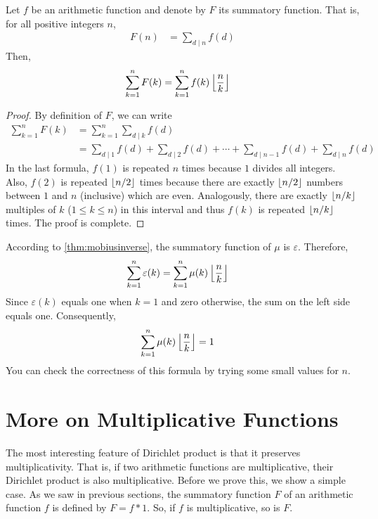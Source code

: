 	\begin{theorem}\label{thm:sum-of-sum-function}
		Let $f$ be an arithmetic function and denote by $F$ its summatory function. That is, for all positive integers $n$,
			\begin{align*}
				F(n) &= \sum_{d\mid n} f(d)
			\end{align*}
		Then,
			\begin{align*}
				\sum_{k=1}^{n} F(k) &= \sum_{k=1}^{n} f(k)\left\lfloor{\frac{n}{k}}\right\rfloor
			\end{align*}
	\end{theorem}

	\begin{proof}
		By definition of $F$, we can write
			\begin{align*}
				\sum_{k=1}^{n} F(k)
					& = \sum_{k=1}^{n} \sum_{d\mid k} f(d)\\
					& = \sum_{d\mid 1} f(d) + \sum_{d\mid 2} f(d)+\cdots + \sum_{d\mid n-1} f(d)+\sum_{d\mid n} f(d)
			\end{align*}
		In the last formula, $f(1)$ is repeated $n$ times because $1$ divides all integers. Also, $f(2)$ is repeated $\left\lfloor{n/2}\right\rfloor$ times because there are exactly $\left\lfloor{n/2}\right\rfloor$ numbers between $1$ and $n$ (inclusive) which are even. Analogously, there are exactly $\left\lfloor{n/k}\right\rfloor$ multiples of $k$ ($1 \leq k \leq n$) in this interval and thus $f(k)$ is repeated $\left\lfloor{n/k}\right\rfloor$ times. The proof is complete.
	\end{proof}

	\begin{example}
		According to \autoref{thm:mobiusinverse}, the summatory function of $\mu$ is $\varepsilon$. Therefore,
			\begin{align*}
				\sum_{k=1}^{n} \varepsilon(k) &= \sum_{k=1}^{n} \mu(k)\left\lfloor{\frac{n}{k}}\right\rfloor
			\end{align*}
		Since $\varepsilon(k)$ equals one when $k=1$ and zero otherwise, the sum on the left side equals one. Consequently,
			\begin{align*}
				\sum_{k=1}^{n} \mu(k)\left\lfloor{\frac{n}{k}}\right\rfloor
					& = 1
			\end{align*}
		You can check the correctness of this formula by trying some small values for $n$.
	\end{example}


\section{More on Multiplicative Functions}
The most interesting feature of Dirichlet product is that it preserves multiplicativity. That is, if two arithmetic functions are multiplicative, their Dirichlet product is also multiplicative. Before we prove this, we show a simple case. As we saw in previous sections, the summatory function $F$ of an arithmetic function $f$ is defined by $F=f\ast 1$. So, if $f$ is multiplicative, so is $F$.

